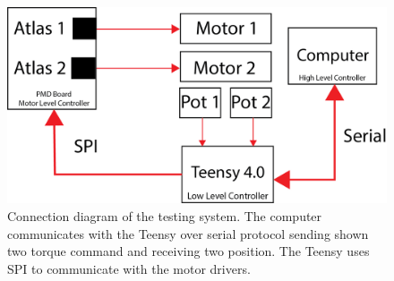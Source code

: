 \begin{figure}
    \centering
    \includegraphics[width=\linewidth]{images/controllers/testing_system_diagam.png}
    \caption[Testing A-SMC System Diagram]{Connection diagram of the testing system. The computer communicates with the Teensy over serial protocol sending shown two torque command and receiving two position. The Teensy uses SPI to communicate with the motor drivers. }
    \label{fig:phyicalTestingDiagram}
\end{figure}









